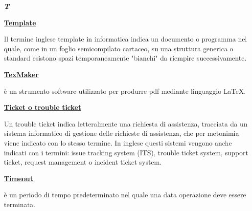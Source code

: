 \cleardoublepage
{}
{}
\noindent\hrulefill\hspace{4mm}\textbf{\textsl{\Huge{T}}}\hspace{4mm}\hrulefill

\vspace*{2\bigskipamount}	

\begin{addmargin}[0em]{0em}		
	\textbf{\underline{Template}}
	\end{addmargin}
	 
\medskip
\begin{addmargin}[5em]{1em}	
Il termine inglese template in informatica indica un documento o programma nel quale, come in un foglio semicompilato cartaceo, su una struttura generica o standard esistono spazi temporaneamente "bianchi" da riempire successivamente.
\end{addmargin}

\bigskip
\begin{addmargin}[0em]{0em}		
	\textbf{\underline{TexMaker}}
\end{addmargin} 
	
\medskip
\begin{addmargin}[5em]{1em}	
è un strumento software utilizzato per produrre pdf mediante linguaggio \LaTeX{}.
\end{addmargin}

\bigskip
\begin{addmargin}[0em]{0em}		
	\textbf{\underline{Ticket o trouble ticket}}
\end{addmargin}
	
\medskip
\begin{addmargin}[5em]{1em}	 
Un trouble ticket indica letteralmente una richiesta di assistenza, tracciata da un sistema informatico di gestione delle richieste di assistenza, che per metonimia viene indicato con lo stesso termine.
In inglese questi sistemi vengono anche indicati con i termini: issue tracking system (ITS), trouble ticket system, support ticket, request management o incident ticket system.
\end{addmargin}

\bigskip
\begin{addmargin}[0em]{0em}	
	\textbf{\underline{Timeout}}
\end{addmargin}

\medskip
\begin{addmargin}[5em]{1em}
è un periodo di tempo predeterminato nel quale una data operazione deve essere terminata.
\end{addmargin}

